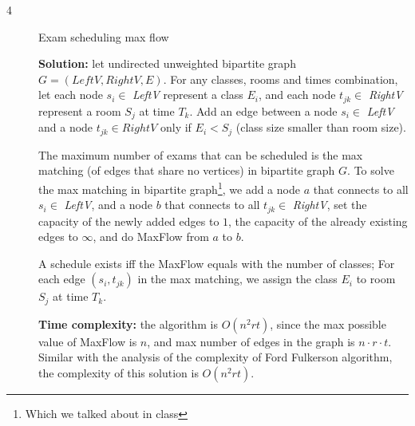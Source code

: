 \documentclass{article}
\begin{document}
\begin{description}
\item[4]{Exam scheduling max flow}

  \textbf{Solution:} let undirected unweighted bipartite graph $G = (LeftV, RightV, E)$. For any classes, rooms and times combination, let each node $s_i \in$ \textit{LeftV} represent a class $E_i$, and each node $t_{jk} \in$ \textit{RightV} represent a room $S_j$ at time $T_k$. Add an edge between a node $s_i \in$ \textit{LeftV} and a node $t_{jk} \in RightV$ only if $E_i < S_j$ (class size smaller than room size).

  The maximum number of exams that can be scheduled is the max matching (of edges that share no vertices) in bipartite graph $G$. To solve the max matching in bipartite graph\footnote{Which we talked about in class}, we add a node $a$ that connects to all $s_i \in$ \textit{LeftV}, and a node $b$ that connects to all $t_{jk} \in$ \textit{RightV}, set the capacity of the newly added edges to $1$, the capacity of the already existing edges to $\infty$, and do MaxFlow from $a$ to $b$.

  A schedule exists iff the MaxFlow equals with the number of classes; For each edge $(s_i, t_{jk})$ in the max matching, we assign the class $E_i$ to room $S_j$ at time $T_k$.

  \textbf{Time complexity:} the algorithm is $O(n^2rt)$, since the max possible value of MaxFlow is $n$, and max number of edges in the graph is $n \cdot r \cdot t$. Similar with the analysis of the complexity of Ford Fulkerson algorithm, the complexity of this solution is $O(n^2rt)$.

\end{description}
\end{document}
